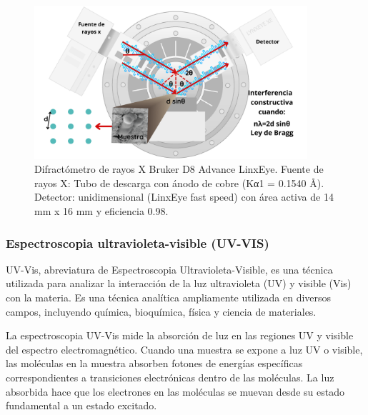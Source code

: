 \documentclass[12pt]{article}
\begin{document}
        
        \begin{figure}[H]
        \centering
    	   \begin{center}
     	  	\includegraphics[width = 0.9\textwidth]{Imagenes/DRX.png}
     	  	\caption{Difractómetro de rayos X Bruker D8 Advance LinxEye. Fuente de rayos X: Tubo de descarga con ánodo de cobre (Kα1 = 0.1540 Å).
            Detector: unidimensional (LinxEye fast speed) con área activa de 14 mm x 16 mm y eficiencia 0.98.}\label{fig:DRX_1}  
    	   \end{center} 
        \end{figure}

        \subsubsection{Espectroscopia ultravioleta-visible (UV-VIS)}
        UV-Vis, abreviatura de Espectroscopia Ultravioleta-Visible, es una técnica utilizada para analizar la interacción de la luz ultravioleta (UV) y visible (Vis) con la materia. Es una técnica analítica ampliamente utilizada en diversos campos, incluyendo química, bioquímica, física y ciencia de materiales.\vspace{1em} %
        
        La espectroscopia UV-Vis mide la absorción de luz en las regiones UV y visible del espectro electromagnético. Cuando una muestra se expone a luz UV o visible, las moléculas en la muestra absorben fotones de energías específicas correspondientes a transiciones electrónicas dentro de las moléculas. La luz absorbida hace que los electrones en las moléculas se muevan desde su estado fundamental a un estado excitado.\vspace{1em} %
        
\end{document}
